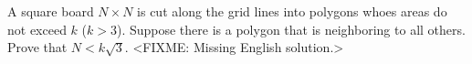 \problem
A square board $N \times N$ is cut along the grid lines into polygons whoes
areas do not exceed $k$ ($k > 3$).
Suppose there is a polygon that is neighboring to all others.
Prove that $N < k \sqrt 3$.
\solution
<FIXME: Missing English solution.>
\endproblem
